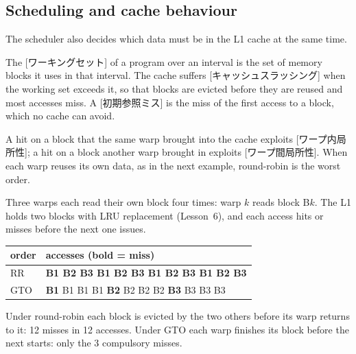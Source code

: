 \documentclass[../main.tex]{subfiles}
\begin{document}
\subsection{Scheduling and cache behaviour}

The scheduler also decides which data must be in the L1 cache at the
same time.

\begin{definition}
  \label{def:l07-working-set}
  The [ワーキングセット] of a program over an
  interval is the set of memory blocks it uses in that interval.
  The cache suffers [キャッシュスラッシング] when
  the working set exceeds it, so that blocks are evicted before they are
  reused and most accesses miss.  A [初期参照ミス]
  is the miss of the first access to a block, which no cache can
  avoid.
\end{definition}

A hit on a block that the same warp brought into the cache exploits
[ワープ内局所性]; a hit on a block another
warp brought in exploits [ワープ間局所性].
  When each
warp reuses its own data, as in the next example, round-robin is the
worst order.

\begin{example}
  \label{ex:l07-thrashing}
  Three warps each read their own block four times: warp $k$ reads
  block B$k$.  The L1 holds two blocks with LRU replacement (Lesson~6),
  and each access hits or misses before the next one issues.
  \begin{center}
    \small
    \begin{tabular}{@{}ll@{}}
      \toprule
      order & accesses (bold = miss) \\
      \midrule
      RR  & \textbf{B1 B2 B3 B1 B2 B3 B1 B2 B3 B1 B2 B3} \\
      GTO & \textbf{B1} B1 B1 B1 \textbf{B2} B2 B2 B2 \textbf{B3} B3 B3 B3 \\
      \bottomrule
    \end{tabular}
  \end{center}
  Under round-robin each block is evicted by the two others before
  its warp returns to it: 12 misses in 12 accesses.  Under GTO each
  warp finishes its block before the next starts: only the 3
  compulsory misses.
\end{example}
\end{document}
